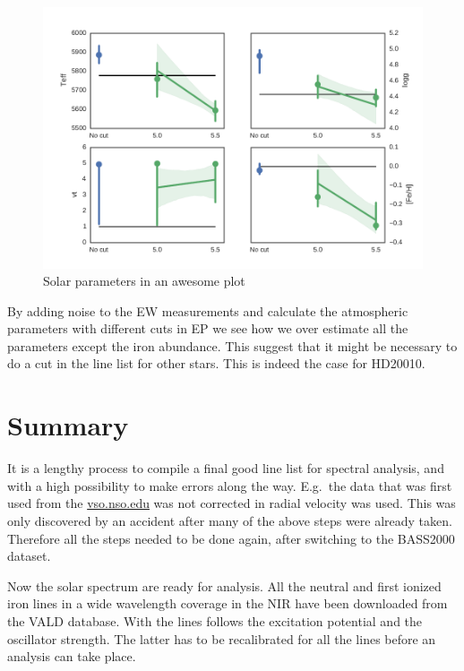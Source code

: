 \documentclass{aa}
\begin{document}
\begin{figure}[htpb]
    \centering
    \includegraphics[width=0.9\linewidth]{figures/solar_parameters_10runs.pdf}
    \caption{Solar parameters in an awesome plot}
    \label{fig:solar_parameters}
\end{figure}

By adding noise to the EW measurements and calculate the atmospheric parameters
with different cuts in EP we see how we over estimate all the parameters except
the iron abundance. This suggest that it might be necessary to do a cut in the
line list for other stars. This is indeed the case for HD20010.











\section{Summary}
\label{sec:conclusion}
It is a lengthy process to compile a final good line list for spectral
analysis, and with a high possibility to make errors along the way. E.g.\ the
data that was first used from the \url{vso.nso.edu} was not corrected in radial
velocity was used. This was only discovered by an accident after many of the
above steps were already taken. Therefore all the steps needed to be done
again, after switching to the BASS2000 dataset.

Now the solar spectrum are ready for analysis. All the neutral and first
ionized iron lines in a wide wavelength coverage in the NIR have been
downloaded from the VALD database. With the lines follows the excitation
potential and the oscillator strength. The latter has to be recalibrated for
all the lines before an analysis can take place.
\end{document}
